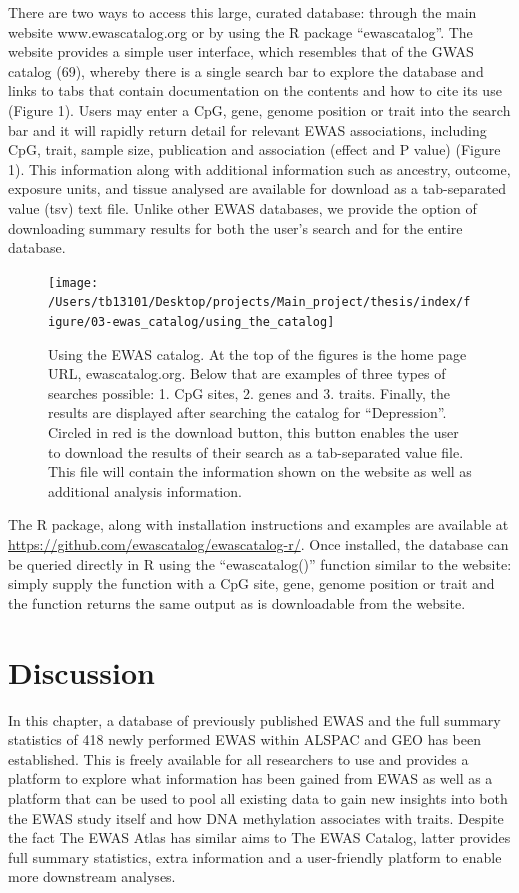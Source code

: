 \documentclass[11pt,twoside]{bristolthesis}
\begin{document}
There are two ways to access this large, curated database: through the main website www.ewascatalog.org or by using the R package ``ewascatalog''. The website provides a simple user interface, which resembles that of the GWAS catalog (69), whereby there is a single search bar to explore the database and links to tabs that contain documentation on the contents and how to cite its use (Figure 1). Users may enter a CpG, gene, genome position or trait into the search bar and it will rapidly return detail for relevant EWAS associations, including CpG, trait, sample size, publication and association (effect and P value) (Figure 1). This information along with additional information such as ancestry, outcome, exposure units, and tissue analysed are available for download as a tab-separated value (tsv) text file. Unlike other EWAS databases, we provide the option of downloading summary results for both the user's search and for the entire database.
\begin{figure}

{\centering \texttt{[image: /Users/tb13101/Desktop/projects/Main\_project/thesis/index/figure/03-ewas\_catalog/using\_the\_catalog]} 

}

\caption{Using the EWAS catalog. 
At the top of the figures is the home page URL, ewascatalog.org. 
Below that are examples of three types of searches possible: 
1. CpG sites, 2. genes and 3. traits. 
Finally, the results are displayed after searching the catalog for “Depression”. 
Circled in red is the download button, this button enables the user to download the results of their search as a tab-separated value file. 
This file will contain the information shown on the website as well as additional analysis information.}\label{fig:catalog-use}
\end{figure}
The R package, along with installation instructions and examples are available at \url{https://github.com/ewascatalog/ewascatalog-r/}. Once installed, the database can be queried directly in R using the ``ewascatalog()'' function similar to the website: simply supply the function with a CpG site, gene, genome position or trait and the function returns the same output as is downloadable from the website.

\hypertarget{discussion}{%
\section{Discussion}\label{discussion}}

In this chapter, a database of previously published EWAS and the full summary statistics of 418 newly performed EWAS within ALSPAC and GEO has been established. This is freely available for all researchers to use and provides a platform to explore what information has been gained from EWAS as well as a platform that can be used to pool all existing data to gain new insights into both the EWAS study itself and how DNA methylation associates with traits. Despite the fact The EWAS Atlas has similar aims to The EWAS Catalog, latter provides full summary statistics, extra information and a user-friendly platform to enable more downstream analyses.
\end{document}
